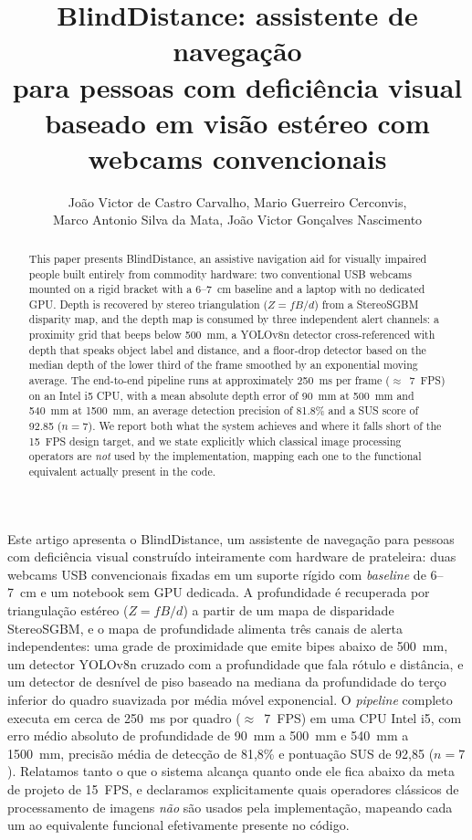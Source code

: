 \documentclass[12pt]{article}
\title{BlindDistance: assistente de navegação\\
para pessoas com deficiência visual\\
baseado em visão estéreo com webcams convencionais}
\author{\small João Victor de Castro Carvalho\inst{1}, Mario Guerreiro Cerconvis\inst{1},\\
Marco Antonio Silva da Mata\inst{1}, João Victor Gonçalves Nascimento\inst{1}}
\begin{document}
\maketitle

\begin{abstract}
This paper presents BlindDistance, an assistive navigation aid for visually
impaired people built entirely from commodity hardware: two conventional USB
webcams mounted on a rigid bracket with a 6--7~cm baseline and a laptop with no
dedicated GPU. Depth is recovered by stereo triangulation
($Z = fB/d$) from a StereoSGBM disparity map, and the depth map is consumed by
three independent alert channels: a proximity grid that beeps below 500~mm, a
YOLOv8n detector cross-referenced with depth that speaks object label and
distance, and a floor-drop detector based on the median depth of the lower
third of the frame smoothed by an exponential moving average. The end-to-end
pipeline runs at approximately 250~ms per frame ($\approx$~7~FPS) on an Intel
i5 CPU, with a mean absolute depth error of 90~mm at 500~mm and 540~mm at
1500~mm, an average detection precision of 81.8\% and a SUS score of 92.85
($n = 7$). We report both what the system achieves and where it falls short of
the 15~FPS design target, and we state explicitly which classical image
processing operators are \emph{not} used by the implementation, mapping each
one to the functional equivalent actually present in the code.
\end{abstract}

\begin{resumo}
Este artigo apresenta o BlindDistance, um assistente de navegação para pessoas
com deficiência visual construído inteiramente com hardware de prateleira:
duas webcams USB convencionais fixadas em um suporte rígido com
\textit{baseline} de 6--7~cm e um notebook sem GPU dedicada. A profundidade é
recuperada por triangulação estéreo ($Z = fB/d$) a partir de um mapa de
disparidade StereoSGBM, e o mapa de profundidade alimenta três canais de alerta
independentes: uma grade de proximidade que emite bipes abaixo de 500~mm, um
detector YOLOv8n cruzado com a profundidade que fala rótulo e distância, e um
detector de desnível de piso baseado na mediana da profundidade do terço
inferior do quadro suavizada por média móvel exponencial. O \textit{pipeline}
completo executa em cerca de 250~ms por quadro ($\approx$~7~FPS) em uma CPU
Intel i5, com erro médio absoluto de profundidade de 90~mm a 500~mm e 540~mm a
1500~mm, precisão média de detecção de 81,8\% e pontuação SUS de 92,85
($n = 7$). Relatamos tanto o que o sistema alcança quanto onde ele fica abaixo
da meta de projeto de 15~FPS, e declaramos explicitamente quais operadores
clássicos de processamento de imagens \emph{não} são usados pela
implementação, mapeando cada um ao equivalente funcional efetivamente presente
no código.
\end{resumo}
\end{document}
